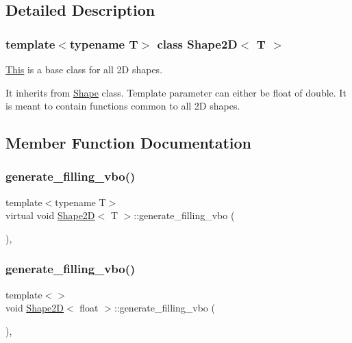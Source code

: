 \subsection{Detailed Description}
\subsubsection*{template$<$typename T$>$\newline
class Shape2\+D$<$ T $>$}

\mbox{\hyperlink{classThis}{This}} is a base class for all 2D shapes. 

It inherits from \mbox{\hyperlink{classShape}{Shape}} class. Template parameter can either be float of double. It is meant to contain functions common to all 2D shapes. 

\subsection{Member Function Documentation}
\mbox{\label{classShape2D_a917c3277ca262ec557930c8cc837c204}} 
\subsubsection{\texorpdfstring{generate\+\_\+filling\+\_\+vbo()}{generate\_filling\_vbo()}\hspace{0.1cm}{\footnotesize\ttfamily [1/2]}}
{\footnotesize\ttfamily template$<$typename T$>$ \\
virtual void \mbox{\hyperlink{classShape2D}{Shape2D}}$<$ T $>$\+::generate\+\_\+filling\+\_\+vbo (\begin{DoxyParamCaption}{ }\end{DoxyParamCaption})\hspace{0.3cm}{\ttfamily [protected]}, {\ttfamily [virtual]}}

\mbox{\label{classShape2D_a328d401b8f1962078e904d4b1003d7a5}} 
\subsubsection{\texorpdfstring{generate\+\_\+filling\+\_\+vbo()}{generate\_filling\_vbo()}\hspace{0.1cm}{\footnotesize\ttfamily [2/2]}}
{\footnotesize\ttfamily template$<$$>$ \\
void \mbox{\hyperlink{classShape2D}{Shape2D}}$<$ float $>$\+::generate\+\_\+filling\+\_\+vbo (\begin{DoxyParamCaption}{ }\end{DoxyParamCaption})\hspace{0.3cm}{\ttfamily [inline]}, {\ttfamily [protected]}}



